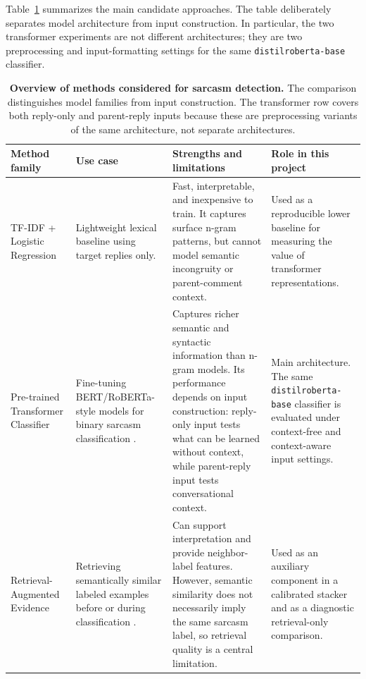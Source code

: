 \documentclass[%
 reprint,
 amsmath,amssymb,
 aps,
]{revtex4-2}
\begin{document}
Table~\ref{tab:methodsoverview} summarizes the main candidate approaches. The table deliberately separates model architecture from input construction. In particular, the two transformer experiments are not different architectures; they are two preprocessing and input-formatting settings for the same \texttt{distilroberta-base} classifier.

\begin{table}
    \caption{{\bf Overview of methods considered for sarcasm detection.} The comparison distinguishes model families from input construction. The transformer row covers both reply-only and parent-reply inputs because these are preprocessing variants of the same architecture, not separate architectures.}
    \label{tab:methodsoverview}
    \small
    \setlength{\tabcolsep}{4pt}
    \begin{tabular}{@{}p{2.8cm}p{3.3cm}p{5.4cm}p{5.2cm}@{}}
    \toprule
       \textbf{Method family} & \textbf{Use case} & \textbf{Strengths and limitations} & \textbf{Role in this project} \\
    \midrule
        TF-IDF + Logistic Regression &
        Lightweight lexical baseline using target replies only. &
        Fast, interpretable, and inexpensive to train. It captures surface n-gram patterns, but cannot model semantic incongruity or parent-comment context. &
        Used as a reproducible lower baseline for measuring the value of transformer representations. \\
    \midrule
        Pre-trained Transformer Classifier &
        Fine-tuning BERT/RoBERTa-style models for binary sarcasm classification \cite{devlin2019bert,liu2019roberta,he2021deberta}. &
        Captures richer semantic and syntactic information than n-gram models. Its performance depends on input construction: reply-only input tests what can be learned without context, while parent-reply input tests conversational context. &
        Main architecture. The same \texttt{distilroberta-base} classifier is evaluated under context-free and context-aware input settings. \\
    \midrule
        Retrieval-Augmented Evidence &
        Retrieving semantically similar labeled examples before or during classification \cite{lewis2020retrieval,yu2023retrieval}. &
        Can support interpretation and provide neighbor-label features. However, semantic similarity does not necessarily imply the same sarcasm label, so retrieval quality is a central limitation. &
        Used as an auxiliary component in a calibrated stacker and as a diagnostic retrieval-only comparison. \\

\end{tabular}
\end{table}
\end{document}
